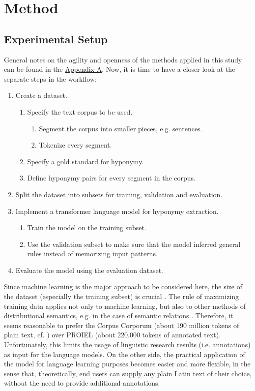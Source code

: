 \chapter{Method}
\section{Experimental Setup}
General notes on the agility and openness of the methods applied in this study can be found in the \hyperref[sec:appendixA]{Appendix A}. Now, it is time to have a closer look at the separate steps in the workflow:
\begin{enumerate}
         \item Create a dataset.
         \begin{enumerate}
		\item Specify the text corpus to be used.
		 \begin{enumerate}
			\item Segment the corpus into smaller pieces, e.g. sentences.
			\item Tokenize every segment.
		\end{enumerate}
		\item Specify a gold standard for hyponymy.
		\item Define hyponymy pairs for every segment in the corpus.
	\end{enumerate}
         \item Split the dataset into subsets for training, validation and evaluation.
         \item Implement a transformer language model \parencite{vaswaniAttentionAllYou2017} for hyponymy extraction.
         \begin{enumerate}
		\item Train the model on the training subset.
		\item Use the validation subset to make sure that the model inferred general rules instead of memorizing input patterns.
	\end{enumerate}
         \item Evaluate the model using the evaluation dataset.
\end{enumerate}
Since machine learning is the major approach to be considered here, the size of the dataset (especially the training subset) is crucial \parencite[13]{hestnessDeepLearningScaling2017}. The rule of maximizing training data applies not only to machine learning, but also to other methods of distributional semantics, e.g. in the case of semantic relations \parencite[27]{herbelotBuildingSharedWorld2015}. Therefore, it seems reasonable to prefer the Corpus Corporum (about 190 million tokens of plain text, cf. \textcite{roelliCorpusCorporumNew2014}) over PROIEL (about 220.000 tokens of annotated text). Unfortunately, this limits the usage of linguistic research results (i.e. annotations) as input for the language models. On the other side, the practical application of the model for language learning purposes becomes easier and more flexible, in the sense that, theoretically, end users can supply any plain Latin text of their choice, without the need to provide additional annotations.

